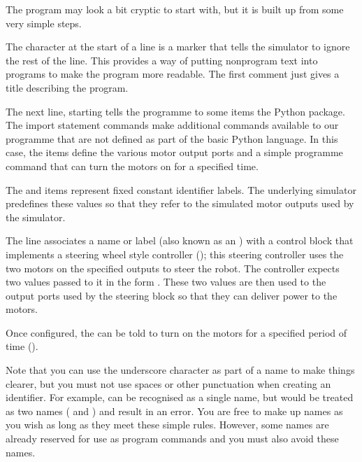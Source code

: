 \documentclass[letterpaper,10pt,english]{sphinxmanual}
\begin{document}
The program may look a bit cryptic to start with, but it is built up from some very simple steps.

The \sphinxcode{\sphinxupquote{\#}} character at the start of a line is a  marker that tells the simulator to ignore the rest of the line. This provides a way of putting non\sphinxhyphen{}program text into programs to make the program more readable. The first comment just gives a title describing the program.

The next line, starting  tells the programme to  some items  the  Python package. The import statement commands make additional commands available to our programme that are not defined as part of the basic Python language. In this case, the items define the various motor output ports and a simple programme command that can turn the motors on for a specified time.

The  and  items represent fixed constant identifier labels. The underlying simulator predefines these values so that they refer to the simulated motor outputs used by the simulator.

The  line associates a  name or label (also known as an ) with a control block that implements a steering wheel style controller (); this steering controller uses the two motors on the specified outputs to steer the robot. The controller expects two values passed to it in the form . These two values are then used to  the output ports used by
the steering block so that they can deliver power to the motors.

Once configured, the  can be told to turn on the motors for a specified period of time ().

Note that you can use the underscore character as part of a name to make things clearer, but you must not use spaces or other punctuation when creating an identifier. For example,  can be recognised as a single name, but  would be treated as two names ( and ) and result in an error. You are free to make up names as you wish as long as they meet these simple rules. However, some names are already reserved for use as program commands and you must also
avoid these names.
\end{document}
